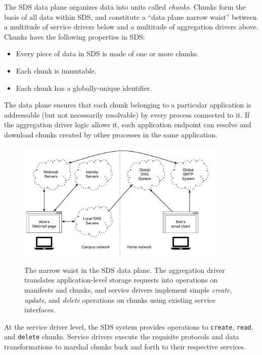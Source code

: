 The SDS data plane organizes data into units called \emph{chunks}.  Chunks form
the basis of all data within SDS, and constitute a ``data plane narrow waist'' between 
a multitude of service drivers below and a multitude of aggregation drivers
above.  Chunks have the following properties in SDS:

\begin{itemize}
    \item Every piece of data in SDS is made of one or more chunks.
    \item Each chunk is immutable.
    \item Each chunk has a globally-unique identifier.
\end{itemize}

The data plane ensures that each chunk belonging to a particular application
is addressable (but not necessarily resolvable) by every process connected to it.
If the aggregation driver logic allows it, each application
endpoint can resolve and download chunks created by other processes in the same
application.

\begin{figure}[h]
   \caption{The narrow waist in the SDS data plane.  The aggregation driver
   translates application-level storage requests into operations on manifests
   and chunks, and service drivers implement simple \textit{create},
   \textit{update}, and \textit{delete} operations on chunks using existing
   service interfaces.}
   \centering
   \includegraphics[width=0.9\textwidth,page=4]{figures/dissertation-figures}
   \label{fig:chap2-narrow-waist}
\end{figure}

At the service driver level, the SDS
system provides operations to \texttt{create}, \texttt{read}, and
\texttt{delete} chunks.  Service drivers execute the requisite protocols
and data transformations to
marshal chunks back and forth to their respective services.

